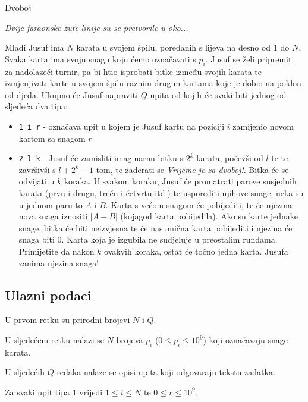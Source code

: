 \begin{statement}[
  problempoints=100,
  timelimit=2 sekunde,
  memorylimit=1024 MiB,
]{Dvoboj}

\textit{Dvije faraonske žute linije su se pretvorile u oko...}

Mladi Jusuf ima $N$ karata u svojem špilu, poredanih s lijeva na desno od $1$ do $N$. Svaka karta ima svoju snagu koju ćemo označavati s $p_i$. Jusuf se želi pripremiti za nadolazeći turnir, pa bi htio isprobati bitke između svojih karata te izmjenjivati karte u svojem špilu raznim drugim kartama koje je dobio na poklon od djeda. Ukupno će Jusuf napraviti $Q$ upita od kojih će svaki biti jednog od sljedeća dva tipa:

\begin{itemize}
\item \texttt{1 i r} - označava upit u kojem je Jusuf kartu na poziciji $i$ zamijenio novom kartom sa snagom $r$
\item \texttt{2 l k} - Jusuf će zamisliti imaginarnu bitku s $2^k$ karata, počevši od $l$-te te završivši s $l + 2^k - 1$-tom, te zaderati se \textit{Vrijeme je za dvoboj!}. Bitka će se odvijati u $k$ koraka. U svakom koraku, Jusuf će promatrati parove susjednih karata (prvu i drugu, treću i četvrtu itd.) te usporediti njihove snage, neka su u jednom paru to $A$ i $B$. Karta s većom snagom će pobijediti, te će njezina nova snaga iznositi $|A - B|$ (kojagod karta pobijedila). Ako su karte jednake snage, bitka će biti neizvjesna te će nasumična karta pobijediti i njezina će snaga biti $0$. Karta koja je izgubila ne sudjeluje u preostalim rundama. Primijetite da nakon $k$ ovakvih koraka, ostat će točno jedna karta. Jusufa zanima njezina snaga! 
\end{itemize} 

\subsection*{Ulazni podaci}

U prvom retku su prirodni brojevi $N$ i $Q$.

U sljedećem retku nalazi se $N$ brojeva $p_i$ ($0 \leq p_i \leq 10^9$) koji označavaju snage karata.

U sljedećih $Q$ redaka nalaze se opisi upita koji odgovaraju tekstu zadatka. 

Za svaki upit tipa $1$ vrijedi $1 \leq i \leq N$ te $0 \leq r \leq 10^9$.


\end{statement}
